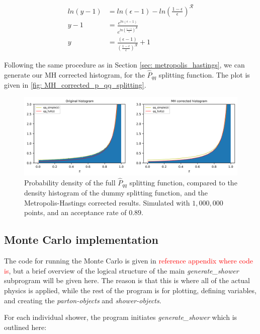 \documentclass[main.tex]{subfiles}
\begin{document}
\begin{align}
    ln(y-1) &= ln(\epsilon-1) - ln\left(\frac{1-\epsilon}{\epsilon} \right)^{\mathcal{R}} \nonumber \\
    y-1 &= \frac{e^{ln(\epsilon-1)}}{e^{ln(\frac{1-\epsilon}{\epsilon})^{\mathcal{R}}}} \nonumber \\
    y &= \frac{(\epsilon-1)}{(\frac{1-\epsilon}{\epsilon})^{\mathcal{R}}} +1
\end{align}

Following the same procedure as in Section \ref{sec: metropolis_hastings}, we can generate our MH corrected histogram, for the \(\hat{P}_{qq}\) splitting function. The plot is given in \autoref{fig: MH_corrected_p_qq_splitting}.

\begin{figure}[ht]
    \centering
    \includegraphics[width=14cm]{pictures/MH_plots/MH_vacuum_qq.png}
    \caption{Probability density of the full \(\hat{P}_{qq}\) splitting function, compared to the density histogram of the dummy splitting function, and the Metropolis-Hastings corrected results. Simulated with \(1,000,000\) points, and an acceptance rate of \(0.89\).}
    \label{fig: MH_corrected_p_qq_splitting}
\end{figure}


\subsection{Monte Carlo implementation}
The  code for running the Monte Carlo is given in \textcolor{red}{reference appendix where code is}, but a brief overview of the logical structure of the main \textit{generate\_shower} subprogram will be given here. The reason is that this is where all of the actual physics is applied, while the rest of the program is for plotting, defining variables, and creating the \textit{parton-objects} and \textit{shower-objects}. 

For each individual shower, the program initiates \textit{generate\_shower} which is outlined here:
\end{document}
